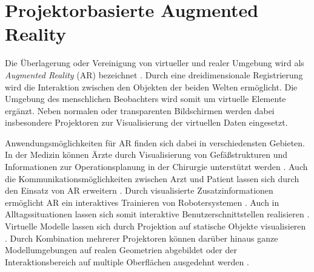 \section{Projektorbasierte Augmented Reality}
Die Überlagerung oder Vereinigung von virtueller und realer Umgebung wird als \textit{Augmented Reality} (AR) bezeichnet \cite{Azuma1997}. Durch eine dreidimensionale Registrierung wird die Interaktion zwischen den Objekten der beiden Welten ermöglicht. Die Umgebung des menschlichen Beobachters wird somit um virtuelle Elemente ergänzt. Neben normalen oder transparenten Bildschirmen werden dabei insbesondere Projektoren zur Visualisierung der virtuellen Daten eingesetzt.\\


Anwendungsmöglichkeiten für AR finden sich dabei in verschiedensten Gebieten. In der Medizin können Ärzte durch Visualisierung von Gefäßstrukturen und Informationen zur Operationsplanung in der Chirurgie unterstützt werden \cite{Nicolau2011}. Auch die Kommunikationsmöglichkeiten zwischen Arzt und Patient lassen sich durch den Einsatz von AR erweitern \cite{Bluteau2005}. Durch visualisierte Zusatzinformationen ermöglicht AR ein interaktives Trainieren von Robotersystemen \cite{DeTommaso2012}. Auch in Alltagssituationen lassen sich somit interaktive Benutzerschnittstellen realisieren \cite{Linder2010}. Virtuelle Modelle lassen sich durch Projektion auf statische Objekte visualisieren \cite{Raskar1999}. Durch Kombination mehrerer Projektoren können darüber hinaus ganze Modellumgebungen auf realen Geometrien abgebildet \cite{Low2001} oder der Interaktionsbereich auf multiple Oberflächen ausgedehnt werden \cite{Wilson2010}.\\



